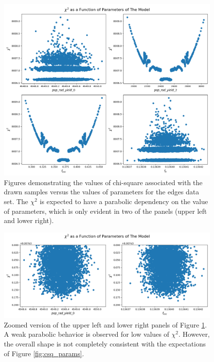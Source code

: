 \documentclass[12pt, TexShade, letterpaper]{report}
\begin{document}
\begin{figure}[h!]
\centering
\includegraphics[scale =0.5]{csq_vs_params_edges.png}
\caption[Chi-Square of Drawn samples as a function of parameter values for \gls{edges} data]{Figures demonstrating the values of chi-square associated with the drawn samples versus the values of parameters for the \gls{edges} data set. The $\chi^2$ is expected to have a parabolic dependency on the value of parameters, which is only evident in two of the panels (upper left and lower right).}
\label{fig:csq_vs_params_edges}
\end{figure}

\begin{figure}[h!]
\centering
\includegraphics[scale =0.5]{csq_vs_params_zoomed_edges.png}
\caption[Chi-Square of Drawn samples as a function of parameter values for the \gls{edges} data, zoomed version]{Zoomed version of the upper left and lower right panels of Figure \ref{fig:csq_vs_params_edges}. A weak parabolic behavior is observed for low values of $\chi^2$. However, the overall shape is not completely consistent with the expectations of Figure \ref{fig:csq_params}.}
\label{fig:csq_vs_params_zoomed_edges}
\end{figure}
\end{document}
